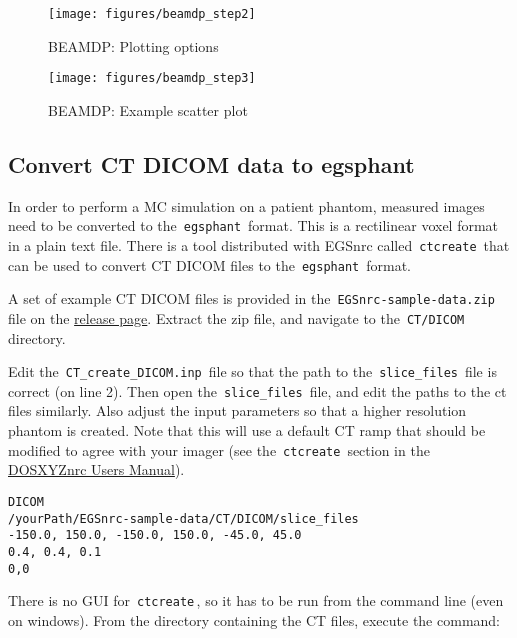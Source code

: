 \documentclass[12pt,twoside]{article}
\begin{document}
\begin{figure}
\begin{center}
\texttt{[image: figures/beamdp\_step2]}
\caption{BEAMDP: Plotting options}
\label{fig:beamdp_step2}
\end{center}
\end{figure}

\begin{figure}
\begin{center}
\texttt{[image: figures/beamdp\_step3]}
\caption{BEAMDP: Example scatter plot}
\label{fig:beamdp_step3}
\end{center}
\end{figure}


\clearpage
\subsection{Convert CT DICOM data to egsphant}
In order to perform a MC simulation on a patient phantom, measured images need to be converted to the \,\Verb|egsphant|\, format. This is a rectilinear voxel format in a plain text file. There is a tool distributed with EGSnrc called \,\Verb|ctcreate|\, that can be used to convert CT DICOM files to the \,\Verb|egsphant|\, format.

A set of example CT DICOM files is provided in the \,\Verb|EGSnrc-sample-data.zip|\, file on the \href{https://github.com/nrc-cnrc/EGSnrc/releases}{release page}. Extract the zip file, and navigate to the \,\Verb|CT/DICOM|\, directory.

Edit the \,\Verb|CT_create_DICOM.inp|\, file so that the path to the \,\Verb|slice_files|\, file is correct (on line 2). Then open the \,\Verb|slice_files|\, file, and edit the paths to the ct files similarly. Also adjust the input parameters so that a higher resolution phantom is created. Note that this will use a default CT ramp that should be modified to agree with your imager (see the \,\Verb|ctcreate|\, section in the \href{https://nrc-cnrc.github.io/EGSnrc/doc/pirs794-dosxyznrc.pdf}{DOSXYZnrc Users Manual}).

{\scriptsize
\begin{lstlisting}[language={},backgroundcolor=\color{white}]
DICOM
/yourPath/EGSnrc-sample-data/CT/DICOM/slice_files
-150.0, 150.0, -150.0, 150.0, -45.0, 45.0
0.4, 0.4, 0.1
0,0
\end{lstlisting}
}

There is no GUI for \,\Verb|ctcreate|\,, so it has to be run from the command line (even on windows). From the directory containing the CT files, execute the command:
\end{document}
